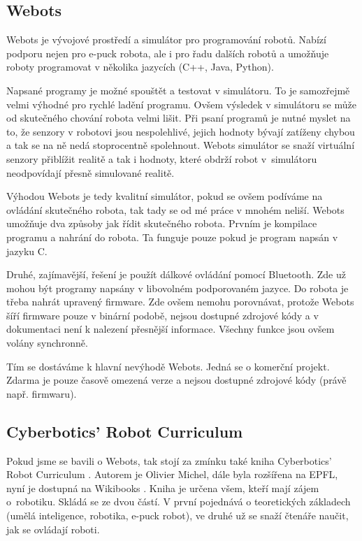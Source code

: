         \subsection{Webots}
        \label{webots}

        Webots \cite{webots} je vývojové prostředí a simulátor pro programování robotů.
        Nabízí podporu nejen pro e-puck robota, ale i pro řadu dalších robotů a
        umožňuje roboty programovat v několika jazycích (C++, Java, Python).

        Napsané programy je možné spouštět a testovat v simulátoru. To je
        samozřejmě velmi výhodné pro rychlé ladění programu. Ovšem výsledek v
        simulátoru se může od skutečného chování robota velmi lišit. Při psaní
        programů je nutné myslet na to, že senzory v robotovi jsou
        nespolehlivé, jejich hodnoty bývají zatíženy chybou a tak se na ně nedá
        stoprocentně spolehnout. Webots simulátor se snaží virtuální senzory
        přiblížit realitě a tak i hodnoty, které obdrží robot v~simulátoru
        neodpovídají přesně simulované realitě.

        Výhodou Webots je tedy kvalitní simulátor, pokud se ovšem podíváme na
        ovládání skutečného robota, tak tady se od mé práce v mnohém neliší.
        Webots umožňuje dva způsoby jak řídit skutečného robota. Prvním je
        kompilace programu a nahrání do robota. Ta funguje pouze pokud je
        program napsán v jazyku C.

        Druhé, zajímavější, řešení je použít dálkové ovládání pomocí
        Bluetooth. Zde už mohou být programy napsány v libovolném podporovaném
        jazyce. Do robota je třeba nahrát upravený firmware. Zde ovšem nemohu
        porovnávat, protože Webots šíří firmware pouze v binární podobě, nejsou
        dostupné zdrojové kódy a v dokumentaci není k nalezení přesnější
        informace. Všechny funkce jsou ovšem volány synchronně.

        Tím se dostáváme k hlavní nevýhodě Webots. Jedná se o komerční projekt.
        Zdarma je pouze časově omezená verze a nejsou dostupné zdrojové kódy
        (právě např. firmwaru).

        \subsection{Cyberbotics' Robot Curriculum}
        \label{curriculum}

        Pokud jsme se bavili o Webots, tak stojí za zmínku také kniha
        Cyberbotics' Robot Curriculum \cite{cyberbotics}. Autorem je Olivier
        Michel, dále byla rozšířena na EPFL, nyní je dostupná na
        Wikibooks \cite{wikibooks}. Kniha je určena všem, kteří mají zájem
        o~robotiku. Skládá se ze dvou částí. V první pojednává o teoretických
        základech (umělá inteligence, robotika, e-puck robot), ve druhé už se
        snaží čtenáře naučit, jak se ovládají roboti.

